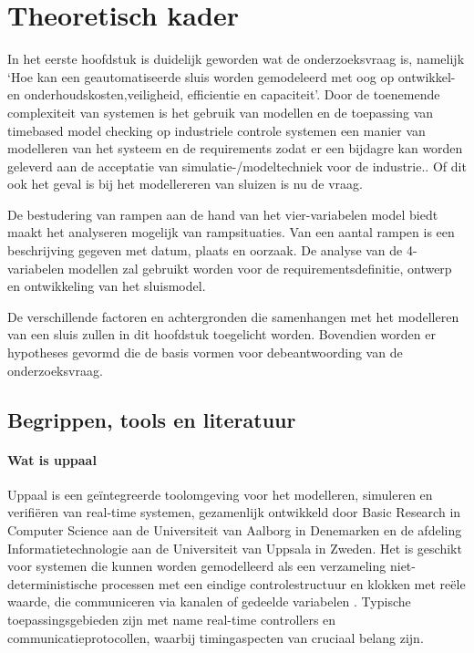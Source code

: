 \documentclass{article}
\begin{document}
	
	\newpage
	
	
	
	
	
	\section{Theoretisch kader}
	In het eerste hoofdstuk is duidelijk geworden wat de onderzoeksvraag is, namelijk ‘Hoe kan een geautomatiseerde sluis worden gemodeleerd met oog op ontwikkel- en onderhoudskosten,veiligheid, efficientie en capaciteit’. Door de toenemende complexiteit van systemen is het gebruik van modellen en de toepassing van timebased model checking  op industriele controle systemen een manier van modelleren van het systeem en de requirements zodat er een bijdagre kan worden geleverd aan de acceptatie van  simulatie-/modeltechniek voor de industrie.\cite{RijnensupervisorsynthesisLock}. Of dit ook het geval is bij het modellereren van sluizen is nu de vraag.
	
	De bestudering van rampen aan de hand van het vier-variabelen model biedt maakt het analyseren mogelijk van rampsituaties. Van een aantal rampen is een beschrijving gegeven met datum, plaats en oorzaak. De analyse van de 4-variabelen modellen zal gebruikt worden voor de requirementsdefinitie, ontwerp en ontwikkeling van het sluismodel. 
	
	De verschillende factoren en achtergronden die  samenhangen met het modelleren van een sluis zullen in dit hoofdstuk toegelicht worden. Bovendien worden er hypotheses gevormd die de basis vormen voor debeantwoording van de onderzoeksvraag. 
	
	\subsection{Begrippen, tools en literatuur}
	
	\paragraph{Wat is uppaal}
	Uppaal is een geïntegreerde toolomgeving voor het modelleren, simuleren en verifiëren van real-time systemen, gezamenlijk ontwikkeld door Basic Research in Computer Science aan de Universiteit van Aalborg in Denemarken en de afdeling Informatietechnologie aan de Universiteit van Uppsala in Zweden. Het is geschikt voor systemen die kunnen worden gemodelleerd als een verzameling niet-deterministische processen met een eindige controlestructuur en klokken met reële waarde, die communiceren via kanalen of gedeelde variabelen . Typische toepassingsgebieden zijn met name real-time controllers en communicatieprotocollen, waarbij timingaspecten van cruciaal belang zijn. %
	
\end{document}
